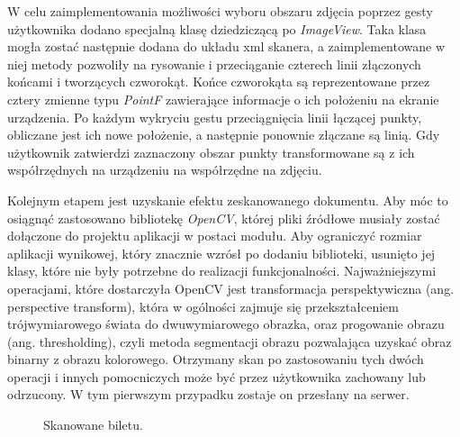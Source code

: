 \par W celu zaimplementowania możliwości wyboru obszaru zdjęcia poprzez gesty użytkownika dodano specjalną klasę dziedziczącą po \textit{ImageView}\cite{ImageView}. Taka klasa mogła zostać następnie dodana do układu xml skanera, a zaimplementowane w niej metody pozwoliły na rysowanie i przeciąganie czterech linii złączonych końcami i tworzących czworokąt. Końce czworokąta są reprezentowane przez cztery zmienne typu \textit{PointF} zawierające informacje o ich położeniu na ekranie urządzenia. Po każdym wykryciu gestu przeciągnięcia linii łączącej punkty, obliczane jest ich nowe położenie, a następnie ponownie złączane są linią. Gdy użytkownik zatwierdzi zaznaczony obszar punkty transformowane są z ich współrzędnych na urządzeniu na współrzędne na zdjęciu.

\par Kolejnym etapem jest uzyskanie efektu zeskanowanego dokumentu. Aby móc to osiągnąć zastosowano bibliotekę \textit{OpenCV}\cite{OpenCV}, której pliki źródłowe musiały zostać dołączone do projektu aplikacji w postaci modułu. Aby ograniczyć rozmiar aplikacji wynikowej, który znacznie wzrósł po dodaniu biblioteki, usunięto jej klasy, które nie były potrzebne do realizacji funkcjonalności. Najważniejszymi operacjami, które dostarczyła OpenCV jest transformacja perspektywiczna (ang. perspective transform), która w ogólności zajmuje się przekształceniem trójwymiarowego świata do dwuwymiarowego obrazka, oraz progowanie obrazu (ang. thresholding), czyli metoda segmentacji obrazu pozwalająca uzyskać obraz binarny z obrazu kolorowego. Otrzymany skan po zastosowaniu tych dwóch operacji i innych pomocniczych może być przez użytkownika zachowany lub odrzucony. W tym pierwszym przypadku zostaje on przesłany na serwer.

\begin{figure}[h]

\centering
{}
\hfill
{}
\hfill

\caption{Skanowane biletu.}
\label{fig:Eimage}
\end{figure}
\FloatBarrier

